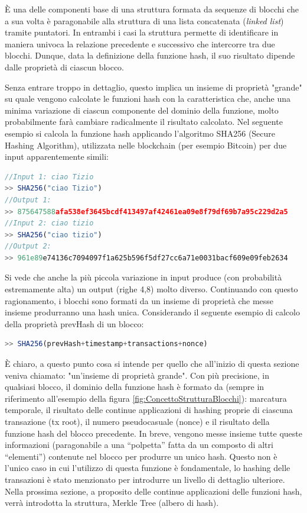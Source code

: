 È una delle componenti base di una struttura formata da sequenze di blocchi che a sua volta è paragonabile alla struttura di una lista concatenata (\emph{linked list}) tramite puntatori. In entrambi i casi la struttura permette di identificare in maniera univoca la relazione precedente e successivo che intercorre tra due blocchi. Dunque, data la definizione della funzione hash, il suo risultato dipende dalle proprietà di ciascun blocco.

Senza entrare troppo in dettaglio, questo implica un insieme di proprietà "grande" su quale vengono calcolate le funzioni hash con la caratteristica che, anche una minima variazione di ciascun componente del dominio della funzione, molto probabilmente farà cambiare radicalmente il risultato calcolato.
Nel seguente esempio si calcola la funzione hash applicando l'algoritmo SHA256 (Secure Hashing Algorithm), utilizzata nelle blockchain (per esempio Bitcoin) per due input apparentemente simili: 

\begin{lstlisting}[caption={Esempio di calcolo della funzione hash SHA256},language=JavaScript]
//Input 1: ciao Tizio
>> SHA256("ciao Tizio")
//Output 1: 
>> 875647588afa538ef3645bcdf413497af42461ea09e8f79df69b7a95c229d2a5
//Input 2: ciao tizio
>> SHA256("ciao tizio")
//Output 2: 
>> 961e89e74136c7094097f1a625b596f5df27cc6a71e0031bacf609e09feb2634
\end{lstlisting}

Si vede che anche la più piccola variazione in input produce (con probabilità estremamente alta) un output (righe 4,8) molto diverso.
Continuando con questo ragionamento, i blocchi sono formati da un insieme di proprietà che messe insieme produrranno una hash unica. Considerando il seguente esempio di calcolo della proprietà prevHash di un blocco:

\begin{lstlisting}[caption={Esempio di calcolo della funzione hash in base alle proprietà del blocco},language=JavaScript]
>> SHA256(prevHash+timestamp+transactions+nonce)
\end{lstlisting}

È chiaro, a questo punto cosa si intende per quello che all'inizio di questa sezione veniva chiamato: "un'insieme di proprietà grande". Con più precisione, in qualsiasi blocco, il dominio della funzione hash è formato da (sempre in riferimento all'esempio della figura \ref{fig:ConcettoStrutturaBlocchi}): marcatura temporale, il risultato delle continue applicazioni di hashing proprie di ciascuna transazione (tx root), il numero pseudocasuale (nonce) e il risultato della funzione hash del blocco precedente. In breve, vengono messe insieme tutte queste informazioni (paragonabile a una “polpetta” fatta da un composto di altri “elementi”) contenute nel blocco per produrre un unico hash. Questo non è l'unico caso in cui l'utilizzo di questa funzione è fondamentale, lo hashing delle transazioni è stato menzionato per introdurre un livello di dettaglio ulteriore. Nella prossima sezione, a proposito delle continue applicazioni delle funzioni hash, verrà introdotta la struttura, Merkle Tree (albero di hash).

